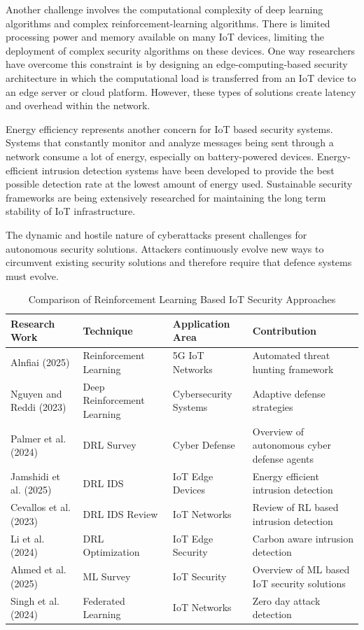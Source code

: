 \documentclass[12pt]{article}
\begin{document}
Another challenge involves the computational complexity of deep learning algorithms and complex reinforcement-learning algorithms. There is limited processing power and memory available on many IoT devices, limiting the deployment of complex security algorithms on these devices. One way researchers have overcome this constraint is by designing an edge-computing-based security architecture in which the computational load is transferred from an IoT device to an edge server or cloud platform. However, these types of solutions create latency and overhead within the network.



Energy efficiency represents another concern for IoT based security systems. Systems that constantly monitor and analyze messages being sent through a network consume a lot of energy, especially on battery-powered devices. Energy-efficient intrusion detection systems have been developed to provide the best possible detection rate at the lowest amount of energy used. Sustainable security frameworks are being extensively researched for maintaining the long term stability of IoT infrastructure.



The dynamic and hostile nature of cyberattacks present challenges for autonomous security solutions. Attackers continuously evolve new ways to circumvent existing security solutions and therefore require that defence systems must evolve.\cite{Wang2023,Gupta2024,Sharma2023}
\begin{table}[h]
\centering
\caption{Comparison of Reinforcement Learning Based IoT Security Approaches}
\begin{tabular}{|p{3.5cm}|p{3cm}|p{4cm}|p{3cm}|}
\hline
\textbf{Research Work} & \textbf{Technique} & \textbf{Application Area} & \textbf{Contribution} \\
\hline
Alnfiai (2025) & Reinforcement Learning & 5G IoT Networks & Automated threat hunting framework \cite{Alnfiai2025} \\
\hline
Nguyen and Reddi (2023) & Deep Reinforcement Learning & Cybersecurity Systems & Adaptive defense strategies \cite{Nguyen2023} \\
\hline
Palmer et al. (2024) & DRL Survey & Cyber Defense & Overview of autonomous cyber defense agents \cite{Palmer2024} \\
\hline
Jamshidi et al. (2025) & DRL IDS & IoT Edge Devices & Energy efficient intrusion detection \cite{Jamshidi2025} \\
\hline
Cevallos et al. (2023) & DRL IDS Review & IoT Networks & Review of RL based intrusion detection \cite{Cevallos2023} \\
\hline
Li et al. (2024) & DRL Optimization & IoT Edge Security & Carbon aware intrusion detection \cite{Li2024} \\
\hline
Ahmed et al. (2025) & ML Survey & IoT Security & Overview of ML based IoT security solutions \cite{Ahmed2025} \\
\hline
Singh et al. (2024) & Federated Learning & IoT Networks & Zero day attack detection \cite{Singh2024} \\
\hline
\end{tabular}
\end{table}
	
\end{document}
